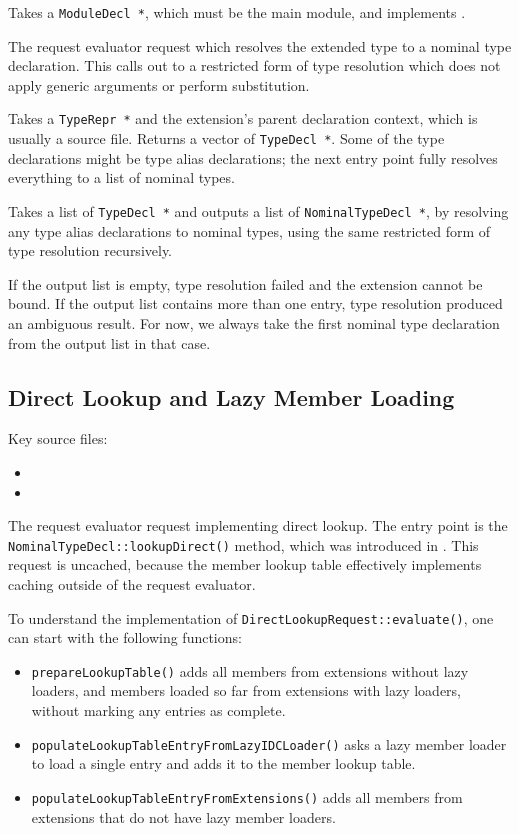 \documentclass[../generics]{subfiles}
\begin{document}
Takes a \texttt{ModuleDecl *}, which must be the main module, and implements .

The request evaluator request which resolves the extended type to a nominal type declaration. This calls out to a restricted form of type resolution which does not apply generic arguments or perform substitution.

Takes a \texttt{TypeRepr *} and the extension's parent declaration context, which is usually a source file. Returns a vector of \texttt{TypeDecl *}. Some of the type declarations might be type alias declarations; the next entry point fully resolves everything to a list of nominal types.

Takes a list of \texttt{TypeDecl *} and outputs a list of \texttt{NominalTypeDecl *}, by resolving any type alias declarations to nominal types, using the same restricted form of type resolution recursively.

If the output list is empty, type resolution failed and the extension cannot be bound. If the output list contains more than one entry, type resolution produced an ambiguous result. For now, we always take the first nominal type declaration from the output list in that case.

\subsection*{Direct Lookup and Lazy Member Loading}

Key source files:
\begin{itemize}
\item {}
\item {}
\end{itemize}

The request evaluator request implementing direct lookup. The entry point is the \texttt{NominalTypeDecl::lookupDirect()} method, which was introduced in . This request is uncached, because the member lookup table effectively implements caching outside of the request evaluator.

To understand the implementation of \verb|DirectLookupRequest::evaluate()|, one can start with the following functions:
\begin{itemize}
\item \texttt{prepareLookupTable()} adds all members from extensions without lazy loaders, and members loaded so far from extensions with lazy loaders, without marking any entries as complete.
\item \texttt{populateLookupTableEntryFromLazyIDCLoader()} asks a lazy member loader to load a single entry and adds it to the member lookup table.
\item \texttt{populateLookupTableEntryFromExtensions()} adds all members from extensions that do not have lazy member loaders.
\end{itemize}
\end{document}
